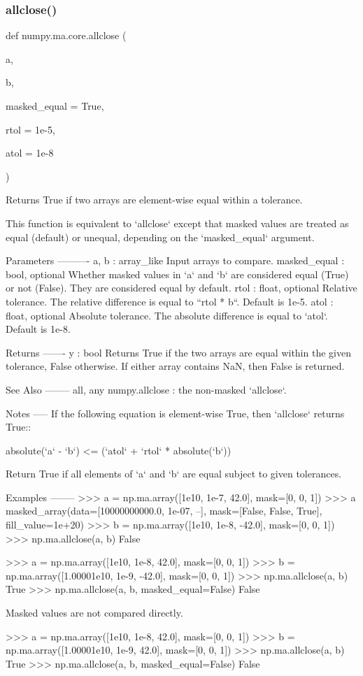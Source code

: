 \subsubsection{\texorpdfstring{allclose()}{allclose()}}
{\footnotesize\ttfamily def numpy.\+ma.\+core.\+allclose (\begin{DoxyParamCaption}\item[{}]{a,  }\item[{}]{b,  }\item[{}]{masked\+\_\+equal = {\ttfamily True},  }\item[{}]{rtol = {\ttfamily 1e-\/5},  }\item[{}]{atol = {\ttfamily 1e-\/8} }\end{DoxyParamCaption})}

\begin{DoxyVerb}Returns True if two arrays are element-wise equal within a tolerance.

This function is equivalent to `allclose` except that masked values
are treated as equal (default) or unequal, depending on the `masked_equal`
argument.

Parameters
----------
a, b : array_like
    Input arrays to compare.
masked_equal : bool, optional
    Whether masked values in `a` and `b` are considered equal (True) or not
    (False). They are considered equal by default.
rtol : float, optional
    Relative tolerance. The relative difference is equal to ``rtol * b``.
    Default is 1e-5.
atol : float, optional
    Absolute tolerance. The absolute difference is equal to `atol`.
    Default is 1e-8.

Returns
-------
y : bool
    Returns True if the two arrays are equal within the given
    tolerance, False otherwise. If either array contains NaN, then
    False is returned.

See Also
--------
all, any
numpy.allclose : the non-masked `allclose`.

Notes
-----
If the following equation is element-wise True, then `allclose` returns
True::

  absolute(`a` - `b`) <= (`atol` + `rtol` * absolute(`b`))

Return True if all elements of `a` and `b` are equal subject to
given tolerances.

Examples
--------
>>> a = np.ma.array([1e10, 1e-7, 42.0], mask=[0, 0, 1])
>>> a
masked_array(data=[10000000000.0, 1e-07, --],
             mask=[False, False,  True],
       fill_value=1e+20)
>>> b = np.ma.array([1e10, 1e-8, -42.0], mask=[0, 0, 1])
>>> np.ma.allclose(a, b)
False

>>> a = np.ma.array([1e10, 1e-8, 42.0], mask=[0, 0, 1])
>>> b = np.ma.array([1.00001e10, 1e-9, -42.0], mask=[0, 0, 1])
>>> np.ma.allclose(a, b)
True
>>> np.ma.allclose(a, b, masked_equal=False)
False

Masked values are not compared directly.

>>> a = np.ma.array([1e10, 1e-8, 42.0], mask=[0, 0, 1])
>>> b = np.ma.array([1.00001e10, 1e-9, 42.0], mask=[0, 0, 1])
>>> np.ma.allclose(a, b)
True
>>> np.ma.allclose(a, b, masked_equal=False)
False\end{DoxyVerb}
